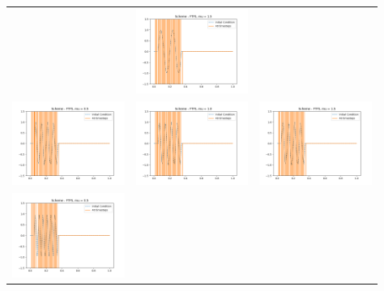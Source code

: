 \documentclass[a4paper,twoside,11pt]{article}
\begin{document}
\begin{table}[h]
\begin{tabular}{ | c | m{5cm} | m{5cm} | }
\begin{minipage}{.3\textwidth}
      \end{minipage}
      &
      \begin{minipage}{.3\textwidth}
        \includegraphics[width=\linewidth, height=2.75cm]{../plots/scheme1-IC2-mu1_5.png}
      \end{minipage} \\
      \begin{minipage}{.3\textwidth}
        \includegraphics[width=\linewidth, height=2.75cm]{../plots/scheme1-IC3-mu0_5.png}
      \end{minipage}
      &
      \begin{minipage}{.3\textwidth}
        \includegraphics[width=\linewidth, height=2.75cm]{../plots/scheme1-IC3-mu1_0.png}
      \end{minipage}
      &
      \begin{minipage}{.3\textwidth}
        \includegraphics[width=\linewidth, height=2.75cm]{../plots/scheme1-IC3-mu1_5.png}
      \end{minipage} \\
      \begin{minipage}{.3\textwidth}
        \includegraphics[width=\linewidth, height=2.75cm]{../plots/scheme1-IC4-mu0_5.png}

\end{minipage}
\end{tabular}
\end{table}
\end{document}
